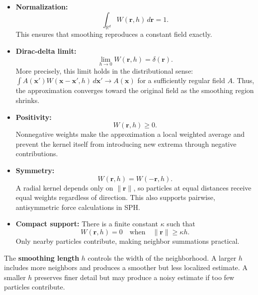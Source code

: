 \documentclass[11pt]{article}
\begin{document}
\begin{itemize}
    \item \textbf{Normalization:}
    \begin{equation}
        \int_{\mathbb{R}^d} W(\mathbf{r},h)\,d\mathbf{r} = 1.
    \end{equation}
    This ensures that smoothing reproduces a constant field exactly.
    \item \textbf{Dirac-delta limit:}
    \begin{equation}
        \lim_{h\to 0} W(\mathbf{r},h) = \delta(\mathbf{r}).
    \end{equation}
    More precisely, this limit holds in the distributional sense:
    $\int A(\mathbf{x}')W(\mathbf{x}-\mathbf{x}',h)\,d\mathbf{x}'
    \to A(\mathbf{x})$ for a sufficiently regular field $A$. Thus, the
    approximation converges toward the original field as the smoothing region
    shrinks.
    \item \textbf{Positivity:}
    \begin{equation}
        W(\mathbf{r},h) \geq 0.
    \end{equation}
    Nonnegative weights make the approximation a local weighted average and
    prevent the kernel itself from introducing new extrema through negative
    contributions.
    \item \textbf{Symmetry:}
    \begin{equation}
        W(\mathbf{r},h) = W(-\mathbf{r},h).
    \end{equation}
    A radial kernel depends only on $\lVert\mathbf{r}\rVert$, so particles at
    equal distances receive equal weights regardless of direction. This also
    supports pairwise, antisymmetric force calculations in SPH.
    \item \textbf{Compact support:} There is a finite constant $\kappa$ such
    that
    \begin{equation}
        W(\mathbf{r},h) = 0
        \quad \text{when} \quad
        \lVert\mathbf{r}\rVert \geq \kappa h.
    \end{equation}
    Only nearby particles contribute, making neighbor summations practical.
\end{itemize}

The \textbf{smoothing length} $h$ controls the width of the neighborhood. A
larger $h$ includes more neighbors and produces a smoother but less localized
estimate. A smaller $h$ preserves finer detail but may produce a noisy estimate
if too few particles contribute.
\end{document}
